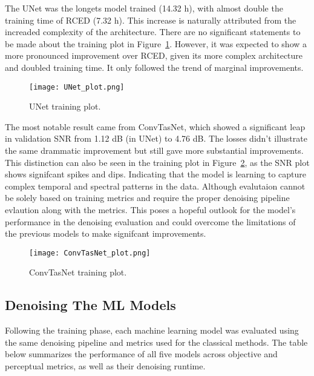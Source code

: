 The UNet was the longets model trained (14.32 h), with almost double the training time of RCED (7.32 h). This increase is naturally attributed from the increaded complexity of the architecture. There are no significant statements to be made about the training plot in Figure~\ref{fig:unet_training_plot}. However, it was expected to show a more pronounced improvement over RCED, given its more complex architecture and doubled training time. It only followed the trend of marginal improvements.

\begin{figure}[H]
    \centering
    \texttt{[image: UNet\_plot.png]}
    \caption{\label{fig:unet_training_plot} UNet training plot.}
\end{figure}

The most notable result came from ConvTasNet, which showed a significant leap in validation SNR from 1.12 dB (in UNet) to 4.76 dB. The losses didn't illustrate the same drammatic improvement but still gave more substantial improvements. This distinction can also be seen in the training plot in Figure~\ref{fig:convtasnet_training_plot}, as the SNR plot shows signifcant spikes and dips. Indicating that the model is learning to capture complex temporal and spectral patterns in the data. Although evalutaion cannot be solely based on training metrics and require the proper denoising pipeline evlaution along with the metrics. This poses a hopeful outlook for the model's performance in the denoising evaluation and could overcome the limitations of the previous models to make signifcant improvements.

\begin{figure}[H]
    \centering
    \texttt{[image: ConvTasNet\_plot.png]}
    \caption{\label{fig:convtasnet_training_plot} ConvTasNet training plot.}
\end{figure}

\subsection{Denoising The ML Models}
\label{sec:denoising_ml_models}

Following the training phase, each machine learning model was evaluated using the same denoising pipeline and metrics used for the classical methods. The table below summarizes the performance of all five models across objective and perceptual metrics, as well as their denoising runtime.

